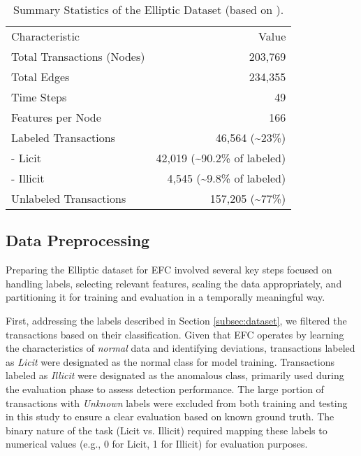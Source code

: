 \documentclass[12pt]{article}
\begin{document}
\begin{table}[htbp]
  \centering
  \caption{Summary Statistics of the Elliptic Dataset (based on \cite{weber2019antimoneylaunderingbitcoinexperimenting}).}
  \label{tab:dataset_summary}
  \begin{tabular}{lr}
    \hline
    Characteristic        & Value \\
    Total Transactions (Nodes) & 203,769 \\
    Total Edges           & 234,355 \\
    Time Steps            & 49 \\
    Features per Node     & 166 \\
    Labeled Transactions  & 46,564 (\textasciitilde23\%) \\
    \quad - Licit         & 42,019 (\textasciitilde90.2\% of labeled) \\
    \quad - Illicit       & 4,545 (\textasciitilde9.8\% of labeled) \\
    Unlabeled Transactions & 157,205 (\textasciitilde77\%) \\
  \end{tabular}
\end{table}

\subsection{Data Preprocessing} \label{subsec:preprocessing}

Preparing the Elliptic dataset for EFC involved several key steps focused on handling labels,
selecting relevant features, scaling the data appropriately, and partitioning it for training and evaluation in a temporally
meaningful way.

First, addressing the labels described in Section \ref{subsec:dataset}, we filtered the transactions based on their
classification. Given that EFC operates by learning the characteristics of \textit{normal} data and identifying deviations,
transactions labeled as \textit{Licit} were designated as the normal class for model training. Transactions labeled as \textit{Illicit}
were designated as the anomalous class, primarily used during the evaluation phase to assess detection performance. The
large portion of transactions with \textit{Unknown} labels were excluded from both training and testing in this study to ensure
a clear evaluation based on known ground truth. The binary nature of the task (Licit vs. Illicit) required mapping these
labels to numerical values (e.g., 0 for Licit, 1 for Illicit) for evaluation purposes.
\end{document}
